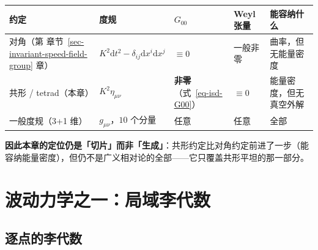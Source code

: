 \documentclass[
  chinese,
  a4paper,
  UTF8,
  12pt,
  oneside,
  openany]{ctexbook}
\newcounter{none} %
\theoremstyle{plain}
\theoremstyle{plain}
\theoremstyle{plain}
\theoremstyle{definition}
\theoremstyle{plain}
\theoremstyle{plain}
\theoremstyle{remark}
\begin{document}
{\def\LTcaptype{none} %
\begin{longtable}[]{@{}
  >{\raggedright\arraybackslash}p{}
  >{\raggedright\arraybackslash}p{}
  >{\raggedright\arraybackslash}p{}
  >{\raggedright\arraybackslash}p{}
  >{\raggedright\arraybackslash}p{}@{}}
\toprule\noalign{}
\begin{minipage}[b]{\linewidth}\raggedright
约定
\end{minipage} & \begin{minipage}[b]{\linewidth}\raggedright
度规
\end{minipage} & \begin{minipage}[b]{\linewidth}\raggedright
\(G_{00}\)
\end{minipage} & \begin{minipage}[b]{\linewidth}\raggedright
Weyl 张量
\end{minipage} & \begin{minipage}[b]{\linewidth}\raggedright
能容纳什么
\end{minipage} \\
\midrule\noalign{}
\endhead
\bottomrule\noalign{}
\endlastfoot
对角（第 章节~\ref{sec-invariant-speed-field-group} 章） &
\(K^{2}\mathrm{d}t^{2}-\delta_{ij}\mathrm{d}x^{i}\mathrm{d}x^{j}\) &
\(\equiv0\) & 一般非零 & 曲率，但无能量密度 \\
共形 / tetrad（本章） & \(K^{2}\eta_{\mu\nu}\) &
\textbf{非零}（式~\ref{eq-isd-G00}） & \(\equiv0\) &
能量密度，但无真空外解 \\
一般度规（3+1 维） & \(g_{\mu\nu}\)，\(10\) 个分量 & 任意 & 任意 &
全部 \\
\end{longtable}
}

\textbf{因此本章的定位仍是「切片」而非「生成」}：共形约定比对角约定前进了一步（能容纳能量密度），但仍不是广义相对论的全部------它只覆盖共形平坦的那一部分。

\section{波动力学之一：局域李代数}\label{sec-isd-lie}

\subsection{逐点的李代数}\label{ux9010ux70b9ux7684ux674eux4ee3ux6570}
\end{document}
